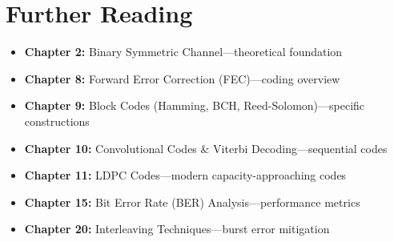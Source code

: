 \section{Further Reading}

\begin{itemize}
\item \textbf{Chapter 2:} Binary Symmetric Channel---theoretical foundation
\item \textbf{Chapter 8:} Forward Error Correction (FEC)---coding overview
\item \textbf{Chapter 9:} Block Codes (Hamming, BCH, Reed-Solomon)---specific constructions
\item \textbf{Chapter 10:} Convolutional Codes \& Viterbi Decoding---sequential codes
\item \textbf{Chapter 11:} LDPC Codes---modern capacity-approaching codes
\item \textbf{Chapter 15:} Bit Error Rate (BER) Analysis---performance metrics
\item \textbf{Chapter 20:} Interleaving Techniques---burst error mitigation
\end{itemize}
